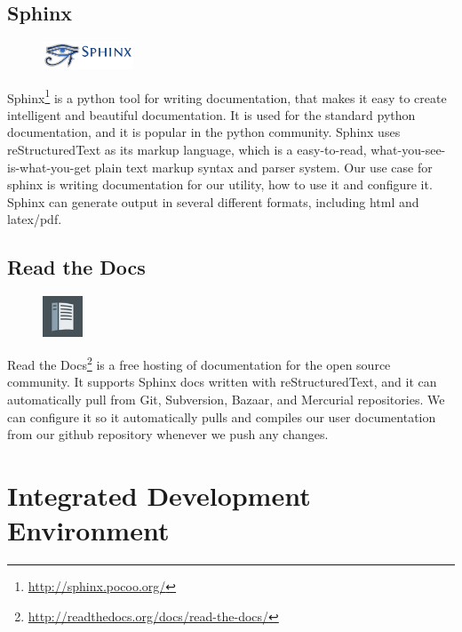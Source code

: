 \subsection{Sphinx}
\begin{figure}
	\vspace{-20pt}
	\includegraphics[width=2.7cm]{./planning/img/sphinx_logo}
	\vspace{-20pt}
\end{figure}
Sphinx\footnote{\url{http://sphinx.pocoo.org/}} is a \Gls{python} tool for writing
documentation, that makes it easy to create intelligent and beautiful
documentation. It is used for the standard \Gls{python} documentation, and it is
popular in the \Gls{python} community. Sphinx uses reStructuredText as its markup
language, which is a easy-to-read, what-you-see-is-what-you-get plain text
markup syntax and \gls{parser} system. Our use case for sphinx is writing
documentation for our \gls{utility}, how to use it and configure it. Sphinx can
generate output in several different formats, including \Gls{html} and latex/pdf.

\subsection{Read the Docs}
\begin{figure}
	\vspace{-20pt}
	\includegraphics[width=1.2cm]{./planning/img/readthedocs_logo}
	\vspace{-20pt}
\end{figure}
Read the Docs\footnote{\url{http://readthedocs.org/docs/read-the-docs/}} is a
free hosting of documentation for the open source community. It supports Sphinx
docs written with reStructuredText, and it can automatically pull from Git,
Subversion, Bazaar, and Mercurial repositories. We can configure it so it
automatically pulls and compiles our user documentation from our github
repository whenever we push any changes.


\section{Integrated Development Environment}
\label{sec:pre:ide}

